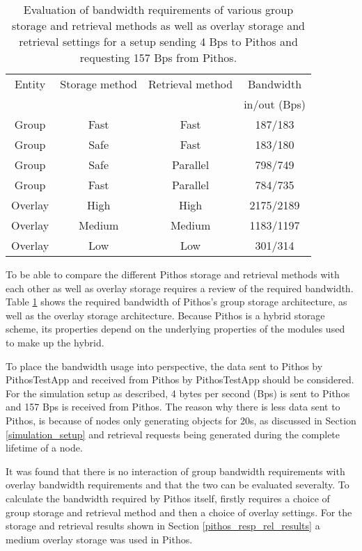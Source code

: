 \begin{table}[htbp]
\centering
\begin{tabular}{|c|c|c|c|}
\hline
Entity & Storage method & Retrieval method     & Bandwidth\\
       &                &                      & in/out (Bps)\\
\hline
Group   &   Fast        &   Fast               &   187/183\\
Group   &   Safe        &   Fast               &   183/180\\
Group   &   Safe        &   Parallel           &   798/749\\
Group   &   Fast        &   Parallel           &   784/735\\
\hline
Overlay &   High        &   High               &  2175/2189\\
Overlay &   Medium      &   Medium             &  1183/1197\\
Overlay &   Low         &   Low                &  301/314  \\
\hline
\end{tabular}
\caption{Evaluation of bandwidth requirements of various group storage and retrieval methods as well as overlay storage and retrieval settings for a setup sending 4 Bps to Pithos and requesting 157 Bps from Pithos.}
\label{tab_bandwidth_results}
\end{table}

To be able to compare the different Pithos storage and retrieval methods with each other as well as overlay storage requires a review of the required bandwidth. Table \ref{tab_bandwidth_results} shows the required bandwidth of Pithos's group storage architecture, as well as the overlay storage architecture. Because Pithos is a hybrid storage scheme, its properties depend on the underlying properties of the modules used to make up the hybrid.

To place the bandwidth usage into perspective, the data sent to Pithos by PithosTestApp and received from Pithos by PithosTestApp should be considered. For the simulation setup as described, 4 bytes per second (Bps) is sent to Pithos and 157 Bps is received from Pithos. The reason why there is less data sent to Pithos, is because of nodes only generating objects for 20s, as discussed in Section \ref{simulation_setup} and retrieval requests being generated during the complete lifetime of a node.

It was found that there is no interaction of group bandwidth requirements with overlay bandwidth requirements and that the two can be evaluated severalty. To calculate the bandwidth required by Pithos itself, firstly requires a choice of group storage and retrieval method and then a choice of overlay settings. For the storage and retrieval results shown in Section \ref{pithos_resp_rel_results} a medium overlay storage was used in Pithos.

